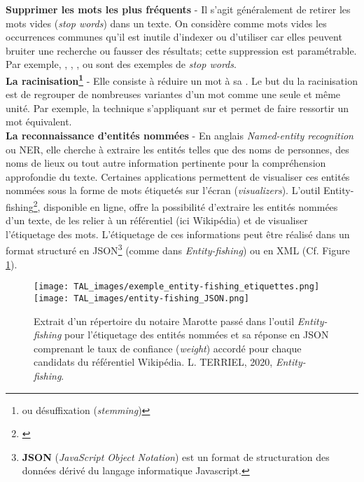 \textbf{Supprimer les mots les plus fréquents} - Il s'agit généralement de retirer les mots vides (\textit{stop words}) dans un texte. On considère comme mots vides les occurrences communes qu'il est inutile d'indexer ou d'utiliser car elles peuvent bruiter une recherche ou fausser des résultats; cette suppression est paramétrable. Par exemple, , , , ou  sont des exemples de \textit{stop words}.\\

\textbf{La racinisation\footnote{ou désuffixation (\textit{stemming})}} - Elle consiste à réduire un mot à sa . Le but du la racinisation est de regrouper de nombreuses variantes d'un mot comme une seule et même unité. Par exemple, la technique s'appliquant sur  et  permet de faire ressortir un mot équivalent.\\

\textbf{La reconnaissance d'entités nommées} - En anglais \textit{Named-entity recognition} ou NER, elle cherche à extraire les entités telles que des noms de personnes, des noms de lieux ou tout autre information pertinente pour la compréhension approfondie du texte. Certaines applications permettent de visualiser ces entités nommées sous la forme de mots étiquetés sur l'écran (\textit{visualizers}). L'outil Entity-fishing\footnote{\cite{lopez_entity-fishing_nodate}}, disponible en ligne, offre la possibilité d'extraire les entités nommées d'un texte, de les relier à un référentiel (ici Wikipédia) et de visualiser l'étiquetage des mots. L'étiquetage de ces informations peut être réalisé dans un format structuré en JSON\footnote{\textbf{JSON} (\textit{JavaScript Object Notation}) est un format de structuration des données dérivé du langage informatique Javascript.} (comme dans \textit{Entity-fishing}) ou en XML (Cf. Figure \ref{fig:NER}).

\begin{figure}
    \centering
    \texttt{[image: TAL\_images/exemple\_entity-fishing\_etiquettes.png]}
    \texttt{[image: TAL\_images/entity-fishing\_JSON.png]}
    \caption{Extrait d'un répertoire du notaire Marotte passé dans l'outil \textit{Entity-fishing} pour l'étiquetage des entités nommées et sa réponse en JSON comprenant le taux de confiance (\textit{weight}) accordé pour chaque candidats du référentiel Wikipédia.  \textcopyright L. TERRIEL, 2020, \textit{Entity-fishing}.}
    \label{fig:NER}
\end{figure}

